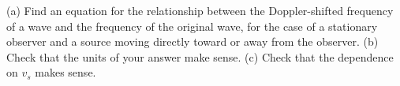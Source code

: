 (a) Find an equation for the relationship between the
Doppler-shifted frequency of a wave and the frequency of the
original wave, for the case of a stationary observer and a
source moving directly toward or away from the observer.\answercheck\hwendpart
(b) Check that the units of your answer make sense.\hwendpart
(c) Check that the dependence on $v_s$ makes sense.
